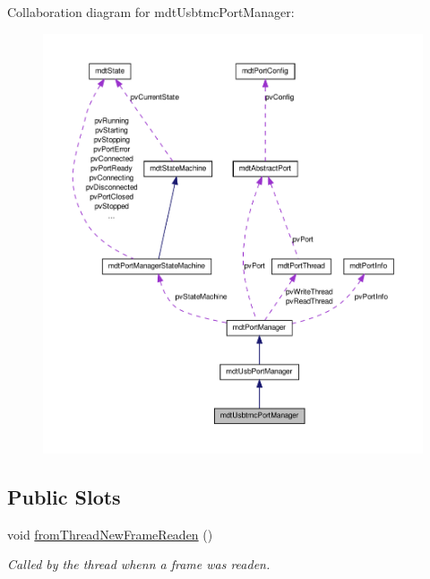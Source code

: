 Collaboration diagram for mdtUsbtmcPortManager:\nopagebreak
\begin{figure}[H]
\begin{center}
\leavevmode
\includegraphics[width=400pt]{classmdt_usbtmc_port_manager__coll__graph}
\end{center}
\end{figure}
\subsection*{Public Slots}
\begin{DoxyCompactItemize}
\item 
void \hyperlink{classmdt_usbtmc_port_manager_aca42b343ae1f6a324e6e45968f03bbea}{fromThreadNewFrameReaden} ()
\begin{DoxyCompactList}\small\item\em Called by the thread whenn a frame was readen. \end{DoxyCompactList}\end{DoxyCompactItemize}
